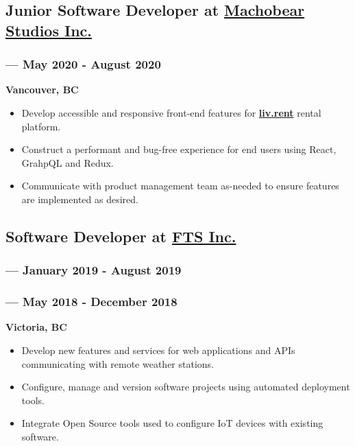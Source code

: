 \documentclass[letterpaper]{article}
\begin{document}
\subsection{Junior Software Developer at \href{https://machobear.ca}{Machobear Studios Inc.}}
\label{sec:org8c287f4}
\vspace{-1.2ex}
\subsubsection{ --- May 2020 - August 2020}
\label{sec:org76f210e}
\vspace{1.2ex}
\textbf{Vancouver, BC}
\begin{itemize}
\item Develop accessible and responsive front-end features for \textbf{\href{https://liv.rent}{liv.rent}} rental platform.
\item Construct a performant and bug-free experience for end users using React, GrahpQL and Redux.
\item Communicate with product management team as-needed to ensure features are implemented as desired.
\end{itemize}
\vspace{0.5ex}
\subsection{Software Developer at \href{https://ftsinc.com}{FTS Inc.}}
\label{sec:orgac5f419}
\vspace{-1.6ex}
\subsubsection{ --- January 2019 - August 2019}
\label{sec:org944bb91}
\vspace{2.4ex}
\subsubsection{ --- May 2018 - December 2018}
\label{sec:org4f3ed0f}
\vspace{-1.9ex}
\textbf{Victoria, BC}
\begin{itemize}
\item Develop new features and services for web applications and APIs communicating with remote weather stations.
\item Configure, manage and version software projects using automated deployment tools.
\item Integrate Open Source tools used to configure IoT devices with existing software.
\end{itemize}
\vspace{0.6ex}
\end{document}
